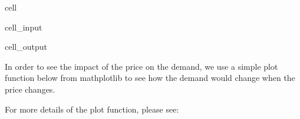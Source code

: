 \documentclass[letterpaper,10pt,english]{jupyterBook}
\begin{document}
\begin{sphinxuseclass}{cell}\begin{sphinxVerbatimInput}

\begin{sphinxuseclass}{cell_input}
\begin{sphinxVerbatim}[commandchars=\\\{\}]
  \PYG{p}{[}\PYG{p}{]}
  \PYG{p}{[}\PYG{p}{[}\PYG{p}{]}\PYG{p}{]}\PYG{p}{[}\PYG{p}{]}
  \PYG{p}{[}\PYG{p}{[}\PYG{p}{]}\PYG{p}{]}\PYG{p}{[}\PYG{p}{]}
  \PYG{p}{[}\PYG{p}{]} \PYG{p}{[}\PYG{p}{]} 
\end{sphinxVerbatim}

\end{sphinxuseclass}\end{sphinxVerbatimInput}
\begin{sphinxVerbatimOutput}

\begin{sphinxuseclass}{cell_output}
\noindent{}

\end{sphinxuseclass}\end{sphinxVerbatimOutput}

\end{sphinxuseclass}
\sphinxAtStartPar
In order to see the impact of the price on the demand, we use a simple plot function below from mathplotlib to see how the demand would change when the price changes.

\sphinxAtStartPar
For more details of the plot function, please see: 
\end{document}
